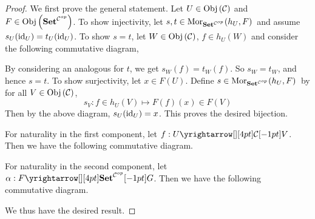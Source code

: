 \begin{proof}

  We first prove the general statement.
  Let $U \in \obj{\CC}$ and $F \in \obj{\SET^{\CC\op}}$.
  To show injectivity, let $s, t \in \mor{h_U}{F}{\SET^{\CC\op}}$ and
  assume $s_U(\id{U}) = t_U(\id{U})$. 
  To show $s = t$, let $W \in \obj{\CC}$, $f \in h_U(W)$ and
  consider the following commutative diagram, 
  \begin{figure}[H]
    \centering
  \end{figure}
  By considering an analogous for $t$,
  we get $s_W(f) = t_W(f)$.
  So $s_W = t_W$, and hence $s = t$. 
  To show surjectivity, let $x \in F(U)$. 
  Define $s \in \mor{h_U}{F}{\SET^{\CC\op}}$ by 
  for all $V \in \obj{\CC}$, \[
    s_V : f \in h_U(V) \mapsto F(f)(x) \in F(V)
  \]
  Then by the above diagram, $s_U(\id{U}) = x$. 
  This proves the desired bijection.

  For naturality in the first component,
  let $f : \map{U}{V}{\CC}{}$.
  Then we have the following commutative diagram. 
  \begin{figure}[H]
    \centering
  \end{figure}
  For naturality in the second component, 
  let $\al : \map{F}{G}{\SET^{\CC\op}}{}$.
  Then we have the following commutative diagram.
  \begin{figure}[H]
    \centering
  \end{figure}
  We thus have the desired result. 


\end{proof}
